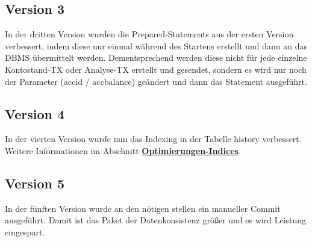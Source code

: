 \subsection{Version 3}\label{subsec:version3}
In der dritten Version wurden die Prepared-Statements aus der ersten Version verbessert, indem diese nur einmal während des Startens erstellt und dann an das DBMS übermittelt werden.
Dementsprechend werden diese nicht für jede einzelne Kontostand-TX oder Analyse-TX erstellt und gesendet, sondern es wird nur noch der Parameter (accid / accbalance) geändert und dann das Statement ausgeführt.




\subsection{Version 4}\label{subsec:version4}
In der vierten Version wurde nun das Indexing in der Tabelle history verbessert.
Weitere Informationen im Abschnitt \hyperref[sec:optimierungen]{\textbf{Optimierungen-Indices}}.

\subsection{Version 5}\label{subsec:version5}
    In der fünften Version wurde an den nötigen stellen ein manueller Commit ausgeführt.
    Damit ist das Paket der Datenkonsistenz größer und es wird Leistung eingespart.
    
